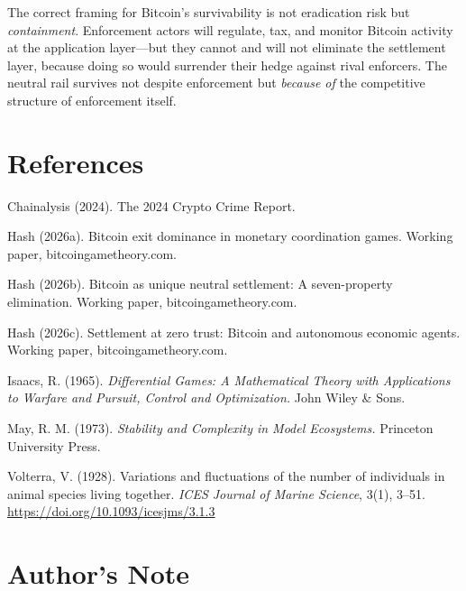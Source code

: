\documentclass[12pt]{article}
\theoremstyle{definition}
\theoremstyle{remark}
\begin{document}
The correct framing for Bitcoin's survivability is not eradication risk
but \emph{containment}. Enforcement actors will regulate, tax, and
monitor Bitcoin activity at the application layer---but they cannot and
will not eliminate the settlement layer, because doing so would surrender
their hedge against rival enforcers. The neutral rail survives not
despite enforcement but \emph{because of} the competitive structure of
enforcement itself.

\section{References}\label{sec:references}

\begin{flushleft}

Chainalysis (2024). The 2024 Crypto Crime Report.

\medskip

Hash (2026a). Bitcoin exit dominance in monetary coordination games.
Working paper, bitcoingametheory.com.

\medskip

Hash (2026b). Bitcoin as unique neutral settlement: A seven-property
elimination. Working paper, bitcoingametheory.com.

\medskip

Hash (2026c). Settlement at zero trust: Bitcoin and autonomous economic
agents. Working paper, bitcoingametheory.com.

\medskip

Isaacs, R. (1965). \emph{Differential Games: A Mathematical Theory with
Applications to Warfare and Pursuit, Control and Optimization.} John
Wiley \& Sons.

\medskip

May, R. M. (1973). \emph{Stability and Complexity in Model Ecosystems.}
Princeton University Press.

\medskip

Volterra, V. (1928). Variations and fluctuations of the number of
individuals in animal species living together. \emph{ICES Journal of
Marine Science}, 3(1), 3--51.
\url{https://doi.org/10.1093/icesjms/3.1.3}

\end{flushleft}

\section{Author's Note}\label{sec:author}
\end{document}
